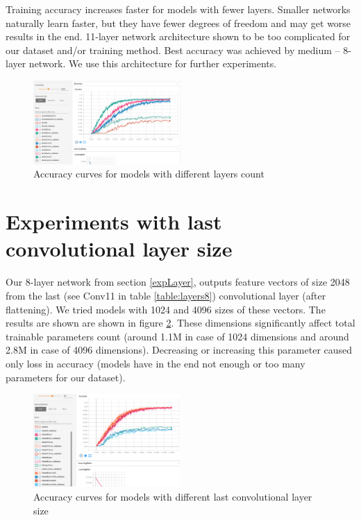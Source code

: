 \documentclass[a4paper]{article}
\begin{document}
Training accuracy increases faster for models with fewer layers.
Smaller networks naturally learn faster, but they have fewer degrees of freedom
and may get worse results in the end.
11-layer network architecture shown to be too complicated for
our dataset and/or training method.
Best accuracy was achieved by medium -- 8-layer network.
We use this architecture for further experiments.

\begin{figure}[!hbt]
    \centering
    \includegraphics[page=2,width=0.5\textwidth]{curvesLayers.png}
    \caption[]{Accuracy curves for models with different layers count
    \label{fig:layersAcc}
    }
\end{figure}

\section{Experiments with last convolutional layer size}

Our 8-layer network from section \ref{expLayer}, outputs
feature vectors of size 2048 from the last (see Conv11 in table \ref{table:layers8}) convolutional layer (after flattening).
We tried models with 1024 and 4096 sizes of these vectors.
The results are shown are shown in figure \ref{fig:lastSize}.
These dimensions significantly affect total trainable parameters count
(around 1.1M in case of 1024 dimensions and around 2.8M in case of 4096 dimensions).
Decreasing or increasing this parameter caused only loss in accuracy
(models have in the end not enough or too many parameters for our dataset).

\begin{figure}[!hbt]
    \centering
    \includegraphics[page=2,width=0.5\textwidth]{lastConvSize.png}
    \caption[]{Accuracy curves for models with different last convolutional layer size
    \label{fig:lastSize}
    }
\end{figure}
\end{document}
